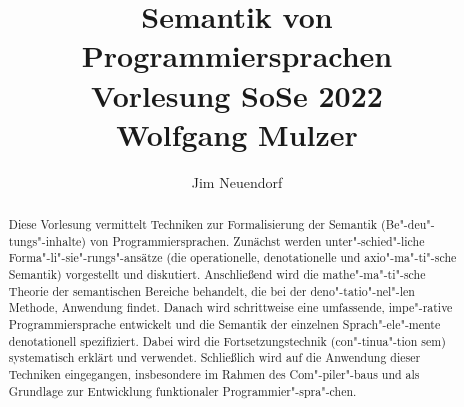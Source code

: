 \title{
    Semantik von Programmiersprachen \\[6pt]
    \large Vorlesung SoSe 2022 \\
    Wolfgang Mulzer
}
\author{Jim Neuendorf}
\maketitle
\begin{abstract}
    \noindent Diese Vorlesung vermittelt Techniken zur Formalisierung der Semantik (Be"-deu"-tungs"-inhalte) von Programmiersprachen. Zunächst werden unter"-schied"-liche Forma"-li"-sie"-rungs"-ansätze (die operationelle, denotationelle und axio"-ma"-ti"-sche Semantik) vorgestellt und diskutiert. Anschließend wird die mathe"-ma"-ti"-sche Theorie der semantischen Bereiche behandelt, die bei der deno"-tatio"-nel"-len Methode, Anwendung findet. Danach wird schrittweise eine umfassende, impe"-rative Programmiersprache entwickelt und die Semantik der einzelnen Sprach"-ele"-mente denotationell spezifiziert. Dabei wird die Fortsetzungstechnik (con"-tinua"-tion sem) systematisch erklärt und verwendet. Schließlich wird auf die Anwendung dieser Techniken eingegangen, insbesondere im Rahmen des Com"-piler"-baus und als Grundlage zur Entwicklung funktionaler Programmier"-spra"-chen.
\end{abstract}